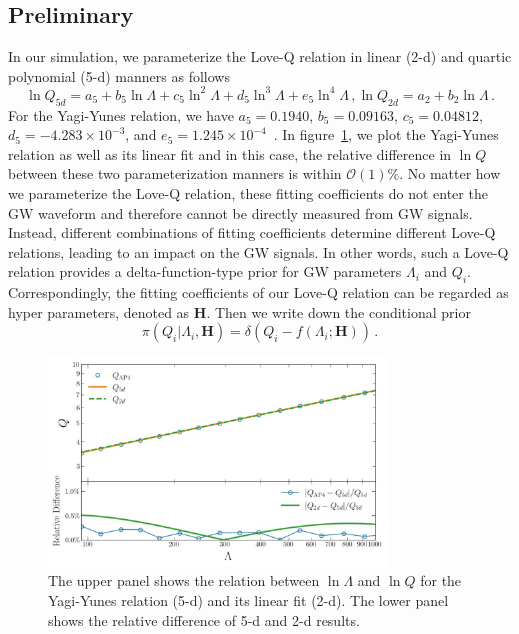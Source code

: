 \documentclass[a4paper,11pt]{article}
\begin{document}
\subsection{Preliminary} 
\label{sec2_1}
In our simulation, we parameterize the Love-Q relation in linear (2-d) and quartic polynomial (5-d) 
manners as follows
\begin{subequations}
\label{Love-Q Relation}
\begin{equation}
\label{5-d_Love_Q_eq}
    \ln Q_{5d}=a_5 + b_5 \ln \Lambda + c_5 \ln^2\Lambda + d_5 \ln^3\Lambda + e_5 \ln^4 \Lambda\,,
\end{equation}
\begin{equation}
\label{2-d_Love_Q_eq}
    \ln Q_{2d} = a_2 + b_2 \ln \Lambda\,.
\end{equation}
\end{subequations}
For the Yagi-Yunes relation, we have $a_5=0.1940$, $b_5=0.09163$, $c_5=0.04812$, 
$d_5=-4.283\times10^{-3}$, and $e_5=1.245\times10^{-4}$~\cite{Yagi_2017}. In figure~\ref{relative_difference}, 
we plot the Yagi-Yunes relation as well as its linear fit and in this case, the relative difference in $\ln Q$ 
between these two parameterization manners is within $\mathcal{O}(1) \%$. No matter how we parameterize the 
Love-Q relation, these fitting coefficients do not enter the GW waveform and therefore cannot be directly 
measured from GW signals. Instead, different combinations of fitting coefficients determine different Love-Q relations, 
leading to an impact on the GW signals. In other words, such a Love-Q relation provides a delta-function-type 
prior for GW parameters $\Lambda_i$ and $Q_i$. Correspondingly, the fitting coefficients of our Love-Q relation 
can be regarded as hyper parameters, denoted as $\bm{H}$. Then we write down the conditional prior
\begin{equation}
\label{delta function prior}
\pi(Q_i|\Lambda_i,\bm{H}) = \delta(Q_i-f(\Lambda_i;\bm{H}))\,.
\end{equation}

\begin{figure}[tbp]
\centering
\includegraphics[width=0.8\textwidth]{2d-5d difference.pdf}%
\caption{\label{relative_difference} The upper panel shows the relation between $\ln \Lambda$ and $\ln Q$ 
for the Yagi-Yunes relation (5-d) and its linear fit (2-d). The lower panel shows the relative difference 
of 5-d and 2-d results.}
\end{figure}
\end{document}
